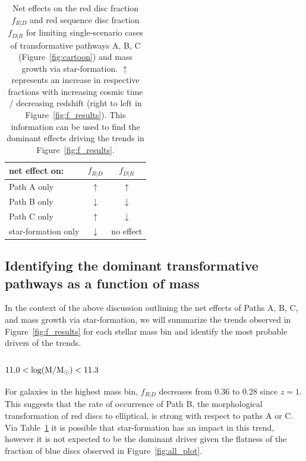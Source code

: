 \documentclass[useAMS,usenatbib]{mn2e}
\begin{document}
\begin{table}
\begin{tabular}{lcc}
\hline
\hline
net effect on:           & $f_{R|D}$      & $f_{D|R}$    \\
\hline
Path A only              &  $\uparrow$    &  $\uparrow$        \\
Path B only              &  $\downarrow$  &  $\downarrow$   \\
Path C only              &  $\uparrow$    &  $\downarrow$   \\
star-formation only      &  $\downarrow$  &  no effect   \\
\hline
\end{tabular}
\caption{Net effects on the red disc fraction $f_{R|D}$ and red sequence disc fraction $f_{D|R}$ for limiting single-scenario cases of transformative pathways A, B, C (Figure~\ref{fig:cartoon}) and mass growth via star-formation. $\uparrow$ represents an increase in respective fractions with increasing cosmic time / decreasing redshift (right to left in Figure~\ref{fig:f_results}). This information can be used to find the dominant effects driving the trends in Figure~\ref{fig:f_results}. }
\label{tab:arrows}
\end{table}


\subsection{Identifying the dominant transformative pathways as a function of mass}
In the context of the above discussion outlining the net effects of Paths A, B, C, and mass growth via star-formation, we will summarize the trends observed in Figure~\ref{fig:f_results} for each stellar mass bin and identify the most probable drivers of the trends. 

\subsubsection{$\rm 11.0<log(M/M_{\odot})<11.3$}

For galaxies in the highest mass bin, $f_{R|D}$ decreases from 0.36 to 0.28 since $z=1$. This suggests that the rate of occurrence of Path B, the morphological transformation of red discs to elliptical, is strong with respect to paths A or C. Via Table~\ref{tab:arrows} it is possible that star-formation has an impact in this trend, however it is not expected to be the dominant driver given the flatness of the fraction of blue discs observed in Figure~\ref{fig:all_plot}.
\end{document}
